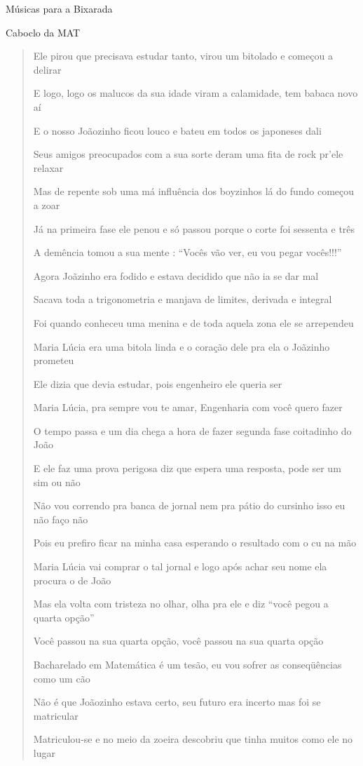 \begin{secao}{Músicas para a Bixarada}
\begin{subsecao}{Caboclo da MAT}
\begin{verse}
Ele pirou que precisava estudar tanto, virou um bitolado e começou a delirar

E logo, logo os malucos da sua idade viram a calamidade, tem babaca novo aí

E o nosso Joãozinho ficou louco e bateu em todos os japoneses dali

Seus amigos preocupados com a sua sorte deram uma fita de rock pr'ele relaxar

Mas de repente sob uma má influência dos boyzinhos lá do fundo começou a zoar

Já na primeira fase ele penou e só passou porque o corte foi sessenta e três

A demência tomou a sua mente : ``Vocês vão ver, eu vou pegar vocês!!!''

Agora Joãzinho era fodido e estava decidido que não ia se dar mal

Sacava toda a trigonometria e manjava de limites, derivada e integral

Foi quando conheceu uma menina e de toda aquela zona ele se arrependeu

Maria Lúcia era uma bitola linda e o coração dele pra ela o Joãzinho prometeu

Ele dizia que devia estudar, pois engenheiro ele queria ser

Maria Lúcia, pra sempre vou te amar, Engenharia com você quero fazer

O tempo passa e um dia chega a hora de fazer segunda fase coitadinho do João

E ele faz uma prova perigosa diz que espera uma resposta, pode ser um sim ou não

Não vou correndo pra banca de jornal nem pra pátio do cursinho isso eu não faço
não

Pois eu prefiro ficar na minha casa esperando o resultado com o cu na mão

Maria Lúcia vai comprar o tal jornal e logo após achar seu nome ela procura o de
João

Mas ela volta com tristeza no olhar, olha pra ele e diz ``você pegou a quarta
opção''

Você passou na sua quarta opção, você passou na sua quarta opção

Bacharelado em Matemática é um tesão, eu vou sofrer as conseqüências como um cão

Não é que Joãozinho estava certo, seu futuro era incerto mas foi se matricular

Matriculou-se e no meio da zoeira descobriu que tinha muitos como ele no lugar


\end{verse}
\end{subsecao}
\end{secao}
